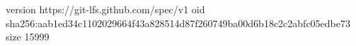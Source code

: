 version https://git-lfs.github.com/spec/v1
oid sha256:aab1ed34c1102029664f43a828514d87f260749ba00d6b18c2c2abfc05edbe73
size 15999

